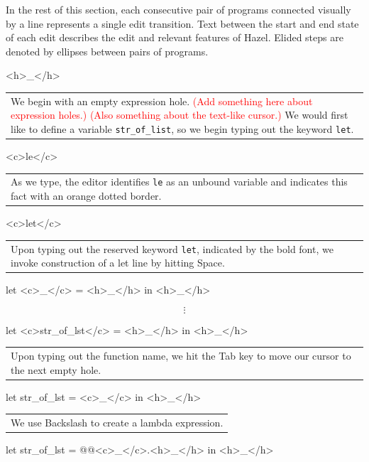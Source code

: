 \documentclass[runningheads]{llncs}
\newcommand{\Hazel}{\textsf{Hazel}\xspace}
\begin{document}
In the rest of this section, each consecutive pair of programs connected
visually by a line represents a single edit transition. Text between the
start and end state of each edit describes the edit and relevant features of
\Hazel. Elided steps are denoted by ellipses between pairs of programs.

\noindent
\begin{hazel}
<h>_</h>
\end{hazel}
	\begin{tabular}{|p{\linewidth}}
	We begin with an empty expression hole.
	\textcolor{red}{(Add something here about expression holes.)}
	\textcolor{red}{(Also something about the text-like cursor.)}
	We would first like to define a variable \texttt{str\_of\_list}, so we begin typing out the keyword
	\texttt{let}. 
	\end{tabular}
\begin{hazel}
<c>le</c>
\end{hazel}
	\begin{tabular}{|p{\linewidth}}
	As we type, the editor identifies \texttt{le} as an unbound variable and indicates this
	fact with an orange dotted border.
	\end{tabular}
\begin{hazel}
<c>let</c>
\end{hazel}
	\begin{tabular}{|p{\linewidth}}
	Upon typing out the reserved keyword \texttt{let}, indicated by the bold font, we invoke
	construction of a let line by hitting Space.
	\end{tabular}
\begin{hazel}
let <c>_</c> = <h>_</h> in
<h>_</h>
\end{hazel}
	\[\vdots\]
\begin{hazel}
let <c>str_of_lst</c> = <h>_</h> in
<h>_</h>
\end{hazel}
	\begin{tabular}{|p{\linewidth}}
	Upon typing out the function name, we hit the Tab key to move our cursor to the next empty hole.
	\end{tabular}
\begin{hazel}
let str_of_lst = <c>_</c> in
<h>_</h>
\end{hazel}
	\begin{tabular}{|p{\linewidth}}
	We use Backslash to create a lambda expression.
	\end{tabular}
\begin{hazel}
let str_of_lst = @\lam @<c>_</c>.{<h>_</h>} in
<h>_</h>
\end{hazel}
\end{document}
